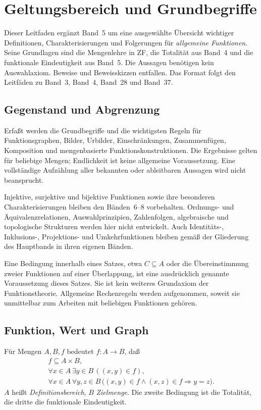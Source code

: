 \chapter{Geltungsbereich und Grundbegriffe}

Dieser Leitfaden ergänzt Band~5 um eine ausgewählte Übersicht
wichtiger Definitionen, Charakterisierungen und Folgerungen für
\emph{allgemeine Funktionen}. Seine Grundlagen sind die Mengenlehre
in ZF, die Totalität aus Band~4 und die funktionale Eindeutigkeit
aus Band~5. Die Aussagen benötigen kein Auswahlaxiom.
Beweise und Beweisskizzen entfallen. Das Format folgt den Leitfäden
zu Band~3, Band~4, Band~28 und Band~37.

\section{Gegenstand und Abgrenzung}

Erfaßt werden die Grundbegriffe und die wichtigsten Regeln für
Funktionsgraphen, Bilder, Urbilder, Einschränkungen, Zusammenfügen,
Komposition und mengenbasierte Funktionskonstruktionen.
Die Ergebnisse gelten für beliebige Mengen; Endlichkeit ist
keine allgemeine Voraussetzung. Eine vollständige Aufzählung aller
bekannten oder ableitbaren Aussagen wird nicht beansprucht.

Injektive, surjektive und bijektive Funktionen sowie ihre besonderen
Charakterisierungen bleiben den Bänden~6--8 vorbehalten.
Ordnungs- und Äquivalenzrelationen, Auswahlprinzipien, Zahlenfolgen,
algebraische und topologische Strukturen werden hier nicht entwickelt.
Auch Identitäts-, Inklusions-, Projektions- und Umkehrfunktionen
bleiben gemäß der Gliederung des Hauptbands in ihren eigenen Bänden.

Eine Bedingung innerhalb eines Satzes, etwa $C\subseteq A$ oder
die Übereinstimmung zweier Funktionen auf einer Überlappung,
ist eine ausdrücklich genannte Voraussetzung dieses Satzes.
Sie ist kein weiteres Grundaxiom der Funktionstheorie.
Allgemeine Rechenregeln werden aufgenommen, soweit sie unmittelbar
zum Arbeiten mit beliebigen Funktionen gehören.

\section{Funktion, Wert und Graph}

\begin{definition}
\label{b05guide:def:function}
Für Mengen $A,B,f$ bedeutet $f\colon A\to B$, daß
\[
 \begin{gathered}
 f\subseteq A\times B,\\
 \forall x\in A\,\exists y\in B\,((x,y)\in f),\\
 \forall x\in A\,\forall y,z\in B\,
   \bigl((x,y)\in f\land(x,z)\in f\Rightarrow y=z\bigr).
 \end{gathered}
\]
$A$ heißt \emph{Definitionsbereich}, $B$ \emph{Zielmenge}.
Die zweite Bedingung ist die Totalität, die dritte die
funktionale Eindeutigkeit.
\end{definition}

